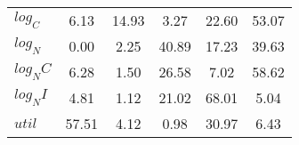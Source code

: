 \begin{center}
\begin{longtable}{lccccc}
$log_C         $	 & 	        6.13	 & 	       14.93	 & 	        3.27	 & 	       22.60	 & 	       53.07 \\ 
$log_N         $	 & 	        0.00	 & 	        2.25	 & 	       40.89	 & 	       17.23	 & 	       39.63 \\ 
$log_NC        $	 & 	        6.28	 & 	        1.50	 & 	       26.58	 & 	        7.02	 & 	       58.62 \\ 
$log_NI        $	 & 	        4.81	 & 	        1.12	 & 	       21.02	 & 	       68.01	 & 	        5.04 \\ 
$util          $	 & 	       57.51	 & 	        4.12	 & 	        0.98	 & 	       30.97	 & 	        6.43 \\ 
\end{longtable}
 \end{center}
